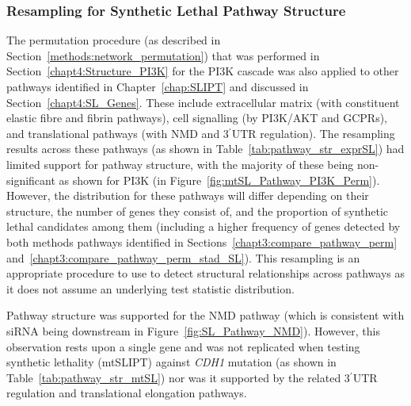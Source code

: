 \FloatBarrier

\subsubsection{Resampling for Synthetic Lethal Pathway Structure}  \label{chapt4:Structure_Perm}

The permutation procedure (as described in Section~\ref{methods:network_permutation}) that was performed in Section~\ref{chapt4:Structure_PI3K} for the \gls{PI3K} cascade was also applied to other pathways identified in Chapter~\ref{chap:SLIPT} and discussed in Section~\ref{chapt4:SL_Genes}. These include extracellular matrix (with constituent elastic fibre and fibrin pathways), cell signalling (by PI3K/AKT and GCPRs), and translational pathways (with \gls{NMD} and 3$^\prime$\gls{UTR} regulation). The resampling results across these pathways (as shown in Table~\ref{tab:pathway_str_exprSL}) had limited support for pathway structure, with the majority of these being non-significant as shown for PI3K (in Figure~\ref{fig:mtSL_Pathway_PI3K_Perm}). However, the distribution for these pathways will differ depending on their structure, the number of genes they consist of, and the proportion of synthetic lethal candidates among them (including a higher frequency of genes detected by both methods pathways identified in Sections~\ref{chapt3:compare_pathway_perm} and~\ref{chapt3:compare_pathway_perm_stad_SL}). This resampling is an appropriate procedure to use to detect structural relationships across pathways as it does not assume an underlying test statistic distribution.

Pathway structure was supported for the \gls{NMD} pathway (which is consistent with \gls{siRNA} being downstream in Figure~\ref{fig:SL_Pathway_NMD}). However, this observation rests upon a single gene and was not replicated when testing synthetic lethality (mtSLIPT) against \textit{CDH1} mutation (as shown in Table~\ref{tab:pathway_str_mtSL}) nor was it supported by the related 3$^\prime$\gls{UTR} regulation and translational elongation pathways.

